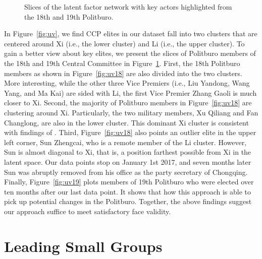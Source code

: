 \documentclass[11pt,english]{article}
\providecommand{\DIFaddendFL}{} %
\DeclareRobustCommand{\DIFaddendFL}{\DIFOaddendFL \let\includegraphics\DIFOincludegraphics} %
\begin{document}
\begin{flushleft}
\begin{center}
\begin{figure}[H]
\begin{centering}
{\begin{centering}
\par\end{centering}
}
\DIFaddendFL \par\end{centering}
\caption{Slices of the latent factor network with key actors highlighted from the 18th and 19th Politburo.}
\label{fig:uvSlices}
\end{figure}
\par\end{center}

In Figure~\ref{fig:uv}, we find CCP elites in our dataset fall into two clusters that are centered around Xi (i.e., the lower cluster) and Li (i.e., the upper cluster). To gain a better view about key elites, we present the slices of Politburo members of the 18th and 19th Central Committee in Figure~\ref{fig:uvSlices}. First, the 18th Politburo members as shown in Figure~\ref{fig:uv18} are also divided into the two clusters. More interesting, while the other three Vice Premiers (i.e., Liu Yandong, Wang Yang, and Ma Kai) are sided with Li, the first Vice Premier Zhang Gaoli is much closer to Xi. Second, the majority of Politburo members in Figure~\ref{fig:uv18} are clustering around Xi. Particularly, the two military members, Xu Qiliang and Fan Changlong, are also in the lower cluster. This dominant Xi cluster is consistent with findings of \citet{Jaros2017}. Third, Figure~\ref{fig:uv18} also points an outlier elite in the upper left corner, Sun Zhengcai, who is a remote member of the Li cluster. However, Sun is almost diagonal to Xi, that is, a position farthest possible from Xi in the latent space. Our data points stop on January 1st 2017, and seven months later Sun was abruptly removed from his office as the party secretary of Chongqing. Finally, Figure~\ref{fig:uv19} plots members of 19th Politburo who were elected over ten months after our last data point. It shows that how this approach is able to pick up potential changes in the Politburo. Together, the above findings suggest our approach suffice to meet satisfactory face validity.

\section*{Leading Small Groups}


\end{flushleft}
\end{document}
